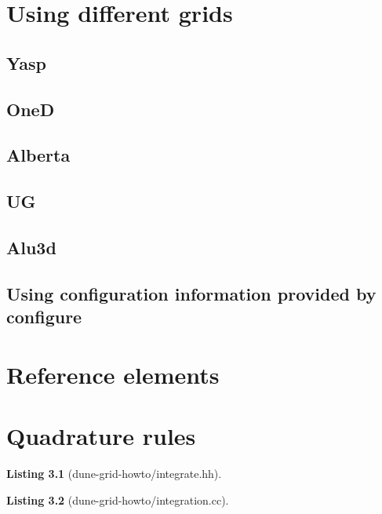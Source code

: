 \documentclass[11pt,a4paper,headinclude,footinclude,DIV14,BCOR8.25mm,titlepage,twoside,openright,normalheadings]{scrreprt}
\newtheorem{lst}{Listing}
\begin{document}
\chapter{Using different grids}

\section{Yasp}

\section{OneD}

\section{Alberta}

\section{UG}

\section{Alu3d}

\section{Using configuration information provided by configure}



\chapter{Reference elements}

\chapter{Quadrature rules}

\begin{lst}[dune-grid-howto/integrate.hh] \mbox{}


\end{lst}

\begin{lst}[dune-grid-howto/integration.cc] \mbox{}


\end{lst}
\end{document}
